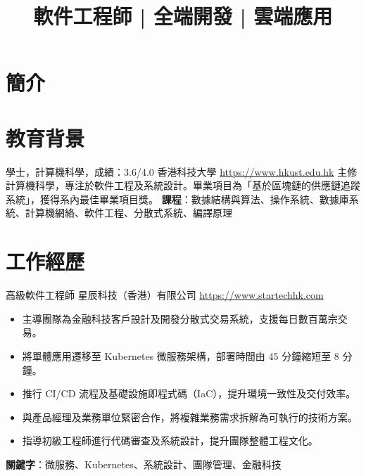 \documentclass[a4paper, serif, 10pt]{moderncv}
\title{軟件工程師 | 全端開發 | 雲端應用}
\begin{document}
\maketitle

\section{簡介}

\section{教育背景}

        {學士，計算機科學，成績：3.6/4.0}
        {香港科技大學}
        {\url{https://www.hkust.edu.hk}}
        {}
        {主修計算機科學，專注於軟件工程及系統設計。畢業項目為「基於區塊鏈的供應鏈追蹤系統」，獲得系內最佳畢業項目獎。
\textbf{課程}：數據結構與算法、操作系統、數據庫系統、計算機網絡、軟件工程、分散式系統、編譯原理}
\section{工作經歷}

        {高級軟件工程師}
        {星辰科技（香港）有限公司}
        {\url{https://www.startechhk.com}}
        {}
        {\begin{itemize}
\item 主導團隊為金融科技客戶設計及開發分散式交易系統，支援每日數百萬宗交易。
\item 將單體應用遷移至 Kubernetes 微服務架構，部署時間由 45 分鐘縮短至 8 分鐘。
\item 推行 CI/CD 流程及基礎設施即程式碼（IaC），提升環境一致性及交付效率。
\item 與產品經理及業務單位緊密合作，將複雜業務需求拆解為可執行的技術方案。
\item 指導初級工程師進行代碼審查及系統設計，提升團隊整體工程文化。
\end{itemize}
\textbf{關鍵字}：微服務、Kubernetes、系統設計、團隊管理、金融科技}
\end{document}
